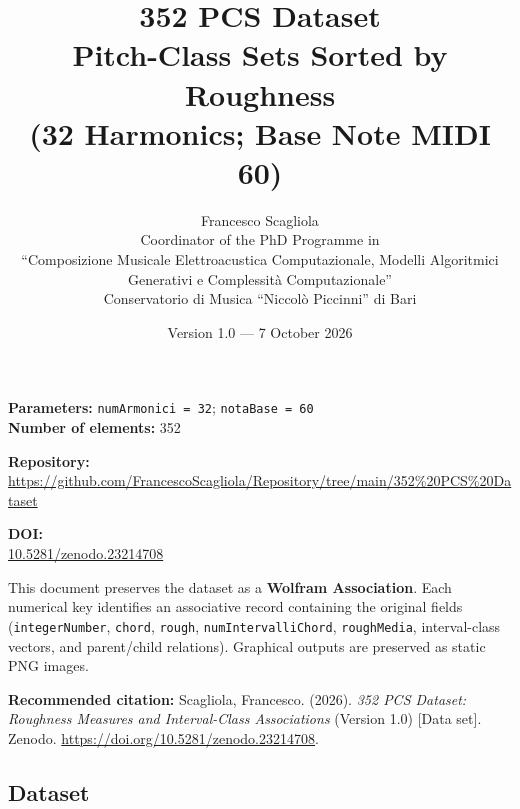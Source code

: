 \documentclass[
]{article}
\title{\textbf{352 PCS Dataset}\\
\large Pitch-Class Sets Sorted by Roughness\\
\normalsize (32 Harmonics; Base Note MIDI 60)}
\author{Francesco Scagliola\\
\small Coordinator of the PhD Programme in\\
\small ``Composizione Musicale Elettroacustica Computazionale, Modelli Algoritmici Generativi e Complessità Computazionale''\\
\small Conservatorio di Musica ``Niccolò Piccinni'' di Bari}
\date{Version 1.0 --- 7 October 2026}
\begin{document}
\maketitle

\begin{center}
\textbf{Parameters:} \texttt{numArmonici = 32}; \texttt{notaBase = 60}\\
\textbf{Number of elements:} 352
\end{center}

\noindent\textbf{Repository:}\\
\url{https://github.com/FrancescoScagliola/Repository/tree/main/352%20PCS%20Dataset}

\noindent\textbf{DOI:}\\
\href{https://doi.org/10.5281/zenodo.23214708}{10.5281/zenodo.23214708}

\medskip
\noindent This document preserves the dataset as a \textbf{Wolfram Association}. Each numerical key identifies an associative record containing the original fields (\texttt{integerNumber}, \texttt{chord}, \texttt{rough}, \texttt{numIntervalliChord}, \texttt{roughMedia}, interval-class vectors, and parent/child relations). Graphical outputs are preserved as static PNG images.

\medskip
\noindent\textbf{Recommended citation:} Scagliola, Francesco. (2026). \textit{352 PCS Dataset: Roughness Measures and Interval-Class Associations} (Version 1.0) [Data set]. Zenodo. \href{https://doi.org/10.5281/zenodo.23214708}{https://doi.org/10.5281/zenodo.23214708}.

\subsection{Dataset}\label{dataset}
\end{document}
